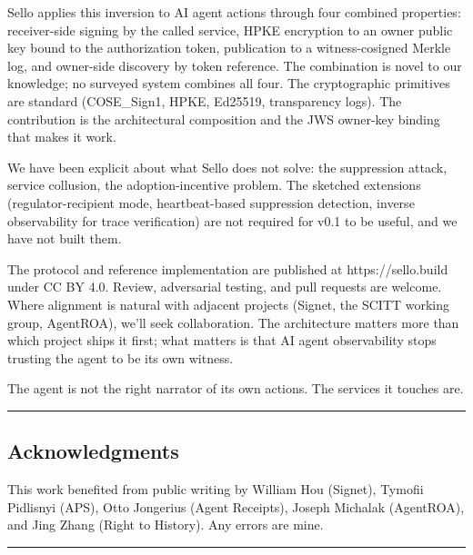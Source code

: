 \documentclass[
  11pt,
]{article}
\begin{document}
Sello applies this inversion to AI agent actions through four combined
properties: receiver-side signing by the called service, HPKE encryption
to an owner public key bound to the authorization token, publication to
a witness-cosigned Merkle log, and owner-side discovery by token
reference. The combination is novel to our knowledge; no surveyed system
combines all four. The cryptographic primitives are standard
(COSE\_Sign1, HPKE, Ed25519, transparency logs). The contribution is the
architectural composition and the JWS owner-key binding that makes it
work.

We have been explicit about what Sello does not solve: the suppression
attack, service collusion, the adoption-incentive problem. The sketched
extensions (regulator-recipient mode, heartbeat-based suppression
detection, inverse observability for trace verification) are not
required for v0.1 to be useful, and we have not built them.

The protocol and reference implementation are published at
https://sello.build under CC BY 4.0. Review, adversarial testing, and
pull requests are welcome. Where alignment is natural with adjacent
projects (Signet, the SCITT working group, AgentROA), we'll seek
collaboration. The architecture matters more than which project ships it
first; what matters is that AI agent observability stops trusting the
agent to be its own witness.

The agent is not the right narrator of its own actions. The services it
touches are.

\begin{center}\rule{0.5\linewidth}{0.5pt}\end{center}

\hypertarget{acknowledgments}{%
\subsection{Acknowledgments}\label{acknowledgments}}

This work benefited from public writing by William Hou (Signet), Tymofii
Pidlisnyi (APS), Otto Jongerius (Agent Receipts), Joseph Michalak
(AgentROA), and Jing Zhang (Right to History). Any errors are mine.

\begin{center}\rule{0.5\linewidth}{0.5pt}\end{center}

  
\end{document}
